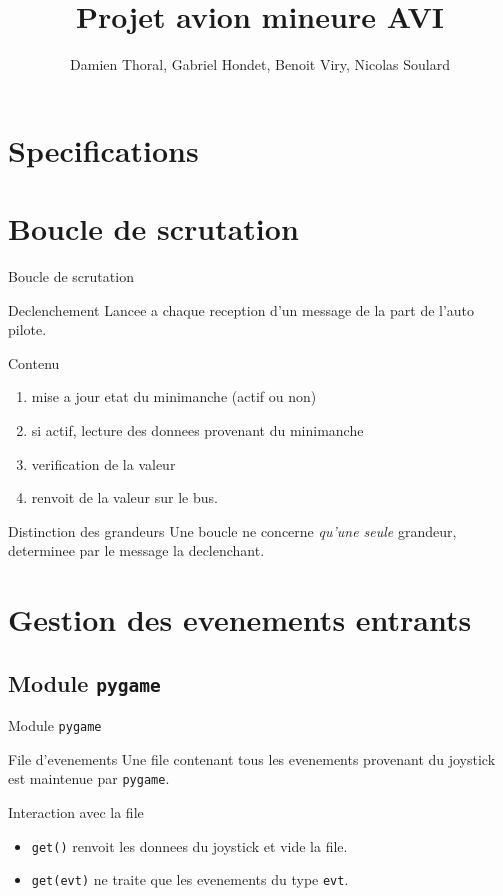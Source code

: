 \documentclass[footheight=2em]{beamer}
\title{Projet avion mineure AVI}
\author{Damien Thoral, Gabriel Hondet, Benoit Viry, Nicolas Soulard}
\date{}
\begin{document}
\frame{\titlepage}


\section{Specifications}

\section{Boucle de scrutation}
\begin{frame}[t]{Boucle de scrutation}
  \begin{block}{Declenchement}
    Lancee a chaque reception d'un message de la part de l'auto pilote.
  \end{block}

  \begin{block}{Contenu}
    \begin{enumerate}
      \item mise a jour etat du minimanche (actif ou non)
      \item si actif, lecture des donnees provenant du minimanche
      \item verification de la valeur
      \item renvoit de la valeur sur le bus.
    \end{enumerate}
  \end{block}

  \begin{block}{Distinction des grandeurs}
    Une boucle ne concerne \emph{qu'une seule} grandeur, determinee par le
    message la declenchant.
  \end{block}
\end{frame}

\section{Gestion des evenements entrants}
\subsection{Module \texttt{pygame}}
\begin{frame}[t]{Module \texttt{pygame}}
  \begin{block}{File d'evenements}
    Une file contenant tous les evenements provenant du joystick est maintenue
    par \texttt{pygame}.
  \end{block}
  \begin{block}{Interaction avec la file}
    \begin{itemize}
      \item \texttt{get()} renvoit les donnees du joystick et vide la file.
      \item \texttt{get(evt)} ne traite que les evenements du type \texttt{evt}.
    \end{itemize}
  \end{block}
\end{frame}
\end{document}
